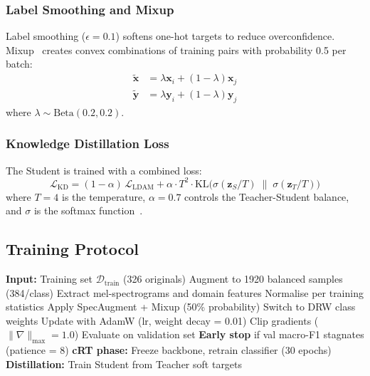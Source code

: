 \documentclass[11pt,a4paper]{article}
\begin{document}
\subsubsection{Label Smoothing and Mixup}

Label smoothing ($\epsilon = 0.1$) softens one-hot targets to reduce
overconfidence. Mixup~\cite{zhang2018mixup} creates convex combinations
of training pairs with probability 0.5 per batch:
\begin{align}
  \tilde{\mathbf{x}} &= \lambda \mathbf{x}_i + (1 - \lambda) \mathbf{x}_j \\
  \tilde{\mathbf{y}} &= \lambda \mathbf{y}_i + (1 - \lambda) \mathbf{y}_j
\end{align}
where $\lambda \sim \text{Beta}(0.2, 0.2)$.

\subsubsection{Knowledge Distillation Loss}

The Student is trained with a combined loss:
\begin{equation}
  \mathcal{L}_{\text{KD}} = (1 - \alpha)\,\mathcal{L}_{\text{LDAM}}
  + \alpha \cdot T^2 \cdot \text{KL}\bigl(
    \sigma(\mathbf{z}_S / T) \;\|\; \sigma(\mathbf{z}_T / T)
  \bigr)
  \label{eq:kd}
\end{equation}
where $T = 4$ is the temperature, $\alpha = 0.7$ controls the
Teacher-Student balance, and $\sigma$ is the softmax
function~\cite{hinton2015distilling}.

\subsection{Training Protocol}
\label{sec:training}

\begin{algorithm}[H]
\caption{Phase~2 Training Pipeline}
\label{alg:training}
\begin{algorithmic}[1]
\State \textbf{Input:} Training set $\mathcal{D}_{\text{train}}$ (326 originals)
\State Augment to 1920 balanced samples (384/class)
\State Extract mel-spectrograms and domain features
\State Normalise per training statistics
    \State Apply SpecAugment + Mixup (50\% probability)
        \State Switch to DRW class weights
    \EndIf
    \State Update with AdamW (lr, weight decay = 0.01)
    \State Clip gradients ($\|\nabla\|_{\max} = 1.0$)
    \State Evaluate on validation set
    \State \textbf{Early stop} if val macro-F1 stagnates (patience = 8)
\EndFor
\State \textbf{cRT phase:} Freeze backbone, retrain classifier (30 epochs)
\State \textbf{Distillation:} Train Student from Teacher soft targets
\end{algorithmic}
\end{algorithm}
\end{document}
